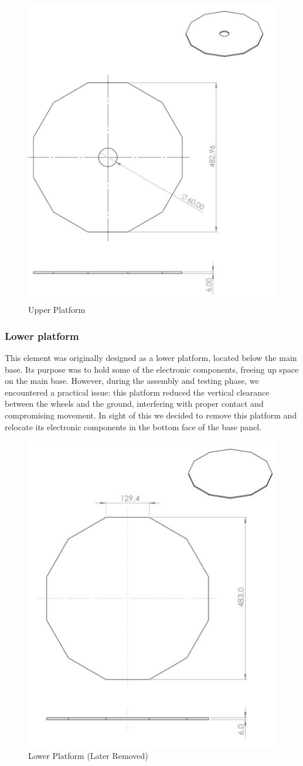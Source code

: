 \begin{figure}[H]
    \centering
    \includegraphics[width=0.6\linewidth]{../ReportMovementModule/images/Aspose.Words.728084da-df58-4b9d-a372-f65cffbdb23d.019.jpeg}
    \caption{Upper Platform}
\end{figure}

\subsubsection{Lower platform}
This element was originally designed as a lower platform, located below the main base. Its purpose was to hold some of the electronic components, freeing up space on the main base. However, during the assembly and testing phase, we encountered a practical issue: this platform reduced the vertical clearance between the wheels and the ground, interfering with proper contact and compromising movement. In sight of this we decided to remove this platform and relocate its electronic components in the bottom face of the base panel.

\begin{figure}[H]
    \centering
    \includegraphics[width=0.6\linewidth]{../ReportMovementModule/images/Aspose.Words.728084da-df58-4b9d-a372-f65cffbdb23d.020.jpeg}
    \caption{Lower Platform (Later Removed)}
\end{figure}

